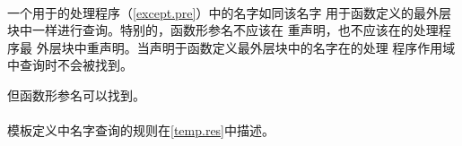 \paragraph{} %
一个用于的处理程序（\ref{except.pre}）中的名字如同该名字
用于函数定义的最外层块中一样进行查询。特别的，函数形参名不应该在
重声明，也不应该在的处理程序最
外层块中重声明。当声明于函数定义最外层块中的名字在的处理
程序作用域中查询时不会被找到。

\begin{note}
  但函数形参名可以找到。
\end{note}

\paragraph{} %
\begin{note}
  模板定义中名字查询的规则在\ref{temp.res}中描述。
\end{note}
